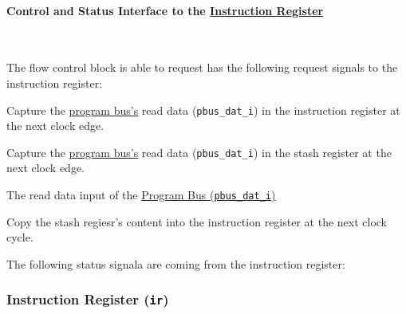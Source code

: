 \paragraph{Control and Status Interface to the \hyperref[architecture:comp:ir]{Instruction Register}} \mbox{} \\
\label{architecture:fc:irif}

The flow control block is able to request has the following request signals to the instruction register: 
\begin{description}[style=nextline]

\item[\texttt{fc2ir\_capture}]
Capture the \hyperref[integration:if:pbus]{program bus's} read data (\texttt{pbus\_dat\_i}) in the
instruction register at the next clock edge.

\item[\texttt{fc2ir\_stash}]
Capture the \hyperref[integration:if:pbus]{program bus's} read data (\texttt{pbus\_dat\_i}) in the
stash register at the next clock edge.

\item[\texttt{fc2ir\_expend}]
The read data input of the \hyperref[integration:if:pbus]{Program Bus (\texttt{pbus\_dat\_i})}

\item[\texttt{fc2ir\_expend}]
Copy the stash regiesr's content into the instruction register at the next clock cycle.

\end{description}

The following status signala are coming from the instruction register:


\subsubsection{Instruction Register (\texttt{ir})}
\label{architecture:comp:ir}







%


